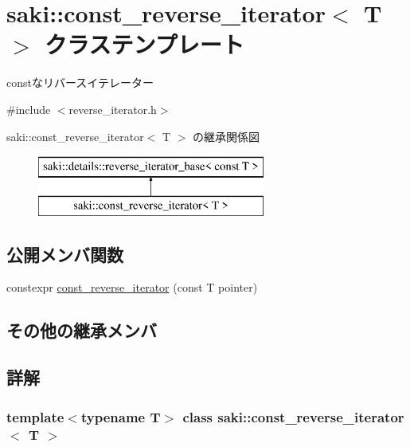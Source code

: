 \hypertarget{classsaki_1_1const__reverse__iterator}{}\section{saki\+:\+:const\+\_\+reverse\+\_\+iterator$<$ T $>$ クラステンプレート}
\label{classsaki_1_1const__reverse__iterator}


constなリバースイテレーター  




{\ttfamily \#include $<$reverse\+\_\+iterator.\+h$>$}

saki\+:\+:const\+\_\+reverse\+\_\+iterator$<$ T $>$ の継承関係図\begin{figure}[H]
\begin{center}
\leavevmode
\includegraphics[height=2.000000cm]{classsaki_1_1const__reverse__iterator}
\end{center}
\end{figure}
\subsection*{公開メンバ関数}
\begin{DoxyCompactItemize}
\item 
constexpr \mbox{\hyperlink{classsaki_1_1const__reverse__iterator_ae696e711d884b66fb36c20262446cfae}{const\+\_\+reverse\+\_\+iterator}} (const T pointer)
\end{DoxyCompactItemize}
\subsection*{その他の継承メンバ}


\subsection{詳解}
\subsubsection*{template$<$typename T$>$\newline
class saki\+::const\+\_\+reverse\+\_\+iterator$<$ T $>$}

